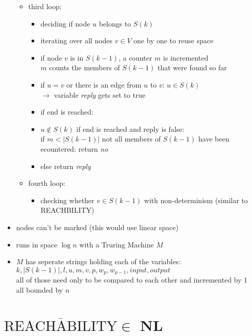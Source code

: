\documentclass[a4]{scrartcl}
\begin{document}
\begin{itemize}
\begin{itemize}
\item third loop:
\begin{itemize}
\item deciding if node $u$ belongs to $S(k)$
\item iterating over all nodes $v \in V$ one by one to reuse space
\item if node $v$ is in $S(k-1)$, a counter $m$ is incremented \\
$m$ counts the members of $S(k-1)$ that were found so far
\item if $u = v$ or there is an edge from $u$ to $v$: $u \in S(k)$ \\
$\rightarrow$ variable \textit{reply} gets set to true \\
\item if end is reached:
\item $u \notin S(k)$ if end is reached and reply is false: \\
if $m  < |S(k-1)|$ not all members of $S(k-1)$ have been ecountered: return \textit{no}
\item else return \textit{reply} \\
\end{itemize}

\item fourth loop:
\begin{itemize}
\item checking whether $v \in S(k-1)$ with non-determinism (similar to REACHBILITY)
\end{itemize}



\end{itemize}

\item nodes can't be marked (this would use linear space) 
\item runs in space $\log n$ with a Truring Machine $M$
\item $M$ has seperate strings holding each of the variables: $k, |S(k-1)|, l, u, m, v, p, w_p, w_{p-1}, input, output$ \\
all of those need only to be compared to each other and incremented by 1 \\
all bounded by $n$ 


\end{itemize}





\section*{$\overline{\text{REACHABILITY}} \in$ NL}
\end{document}
